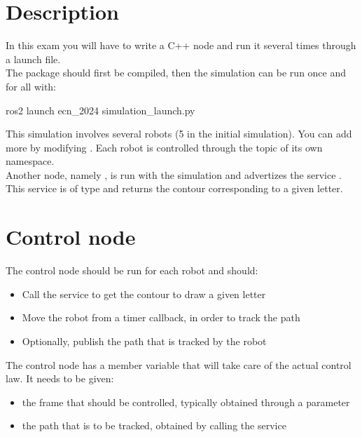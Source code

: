 \documentclass{ecnreport}
\begin{document}



\section{Description}

In this exam you will have to write a C++ node and run it several times through a launch file.\\

The package should first be compiled, then the simulation can be run once and for all with:
\begin{bashcodelarge}
 ros2 launch ecn_2024 simulation_launch.py
\end{bashcodelarge}

This simulation involves several robots (5 in the initial simulation). You can add more by modifying . Each robot is controlled through the  topic of its own namespace.\\

Another node, namely , is run with the simulation and advertizes the service . This service is of type  and returns the contour corresponding to a given letter.


\section{Control node}

The control node should be run for each robot and should:
\begin{itemize}
 \item Call the  service to get the contour to draw a given letter
 \item Move the robot from a timer callback, in order to track the path
 \item Optionally, publish the path that is tracked by the robot
\end{itemize}
The control node has a  member variable that will take care of the actual control law. It needs to be given:
\begin{itemize}
 \item the frame that should be controlled, typically obtained through a parameter
 \item the path that is to be tracked, obtained by calling the service
\end{itemize}
\end{document}
